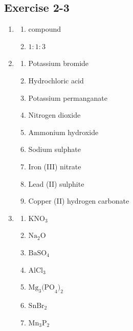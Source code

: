 \subsection{Exercise 2-3} 
\begin{multicols}{3}
\begin{enumerate}[noitemsep, label=\textbf{\arabic*}. ] 
\item %
\begin{enumerate}[noitemsep, label=\textbf{(\alph*)} ] 
\item compound
\item $1:1:3$
\end{enumerate}
\item %
\begin{enumerate}[noitemsep, label=\textbf{(\alph*)} ] 
\item Potassium bromide
\item Hydrochloric acid
\item Potassium permanganate
\item Nitrogen dioxide
\item Ammonium hydroxide
\item Sodium sulphate
\item Iron (III) nitrate
\item Lead (II) sulphite
\item Copper (II) hydrogen carbonate
\end{enumerate}
\item %
\begin{enumerate}[noitemsep, label=\textbf{(\alph*)} ] 
\item $\text{KNO}_3$
\item $\text{Na}_{2}\text{O}$
\item $\text{BaSO}_4$
\item $\text{AlCl}_3$
\item $\text{Mg}_{3}\text{(PO}_4\text{)}_{2}$
\item $\text{SnBr}_2$
\item $\text{Mn}_{3}\text{P}_{2}$
\end{enumerate}
\end{enumerate}
\end{multicols}

